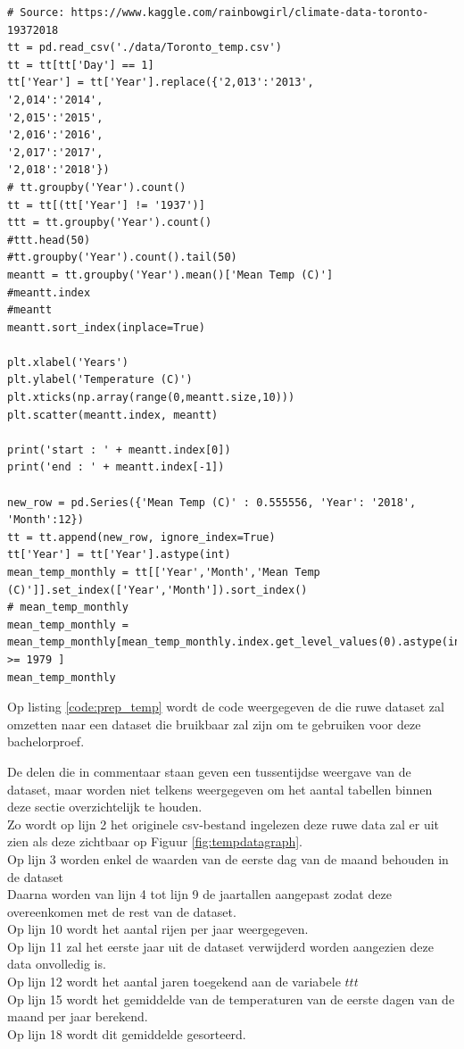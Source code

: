 \clearpage
{}
\label{code:prep_temp}
\begin{verbatim}
# Source: https://www.kaggle.com/rainbowgirl/climate-data-toronto-19372018
tt = pd.read_csv('./data/Toronto_temp.csv')
tt = tt[tt['Day'] == 1]
tt['Year'] = tt['Year'].replace({'2,013':'2013',
'2,014':'2014',
'2,015':'2015',
'2,016':'2016',
'2,017':'2017',
'2,018':'2018'})
# tt.groupby('Year').count()
tt = tt[(tt['Year'] != '1937')]
ttt = tt.groupby('Year').count()
#ttt.head(50)
#tt.groupby('Year').count().tail(50)
meantt = tt.groupby('Year').mean()['Mean Temp (C)']
#meantt.index
#meantt
meantt.sort_index(inplace=True)

plt.xlabel('Years')
plt.ylabel('Temperature (C)')
plt.xticks(np.array(range(0,meantt.size,10)))
plt.scatter(meantt.index, meantt)

print('start : ' + meantt.index[0])
print('end : ' + meantt.index[-1])

new_row = pd.Series({'Mean Temp (C)' : 0.555556, 'Year': '2018', 'Month':12})
tt = tt.append(new_row, ignore_index=True)
tt['Year'] = tt['Year'].astype(int)
mean_temp_monthly = tt[['Year','Month','Mean Temp (C)']].set_index(['Year','Month']).sort_index()
# mean_temp_monthly
mean_temp_monthly = mean_temp_monthly[mean_temp_monthly.index.get_level_values(0).astype(int) >= 1979 ]
mean_temp_monthly
\end{verbatim}

Op listing \ref{code:prep_temp} wordt de code weergegeven de die ruwe dataset zal omzetten naar een dataset die bruikbaar zal zijn om te gebruiken voor deze bachelorproef. 


De delen die in commentaar staan geven een tussentijdse weergave van de dataset, maar worden niet telkens weergegeven om het aantal tabellen binnen deze sectie overzichtelijk te houden. \\


Zo wordt op lijn 2 het originele csv-bestand ingelezen deze ruwe data zal er uit zien als deze zichtbaar op Figuur \ref{fig:tempdatagraph}. \\
Op lijn 3 worden enkel de waarden van de eerste dag van de maand behouden in de dataset \\
Daarna worden van lijn 4 tot lijn 9 de jaartallen aangepast zodat deze overeenkomen met de rest van de dataset. \\
Op lijn 10 wordt het aantal rijen per jaar weergegeven. \\
Op lijn 11 zal het eerste jaar uit de dataset verwijderd worden aangezien deze data onvolledig is. \\
Op lijn 12 wordt het aantal jaren toegekend aan de variabele $ttt$ \\
Op lijn 15 wordt het gemiddelde van de temperaturen van de eerste dagen van de maand per jaar berekend. \\
Op lijn 18 wordt dit gemiddelde gesorteerd. \\



